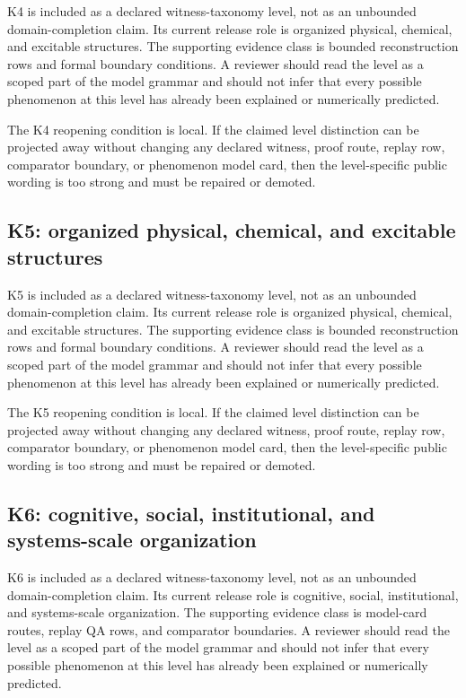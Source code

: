 K4 is included as a declared witness-taxonomy level, not as an unbounded domain-completion claim. Its current release role is organized physical, chemical, and excitable structures. The supporting evidence class is bounded reconstruction rows and formal boundary conditions. A reviewer should read the level as a scoped part of the model grammar and should not infer that every possible phenomenon at this level has already been explained or numerically predicted.


The K4 reopening condition is local. If the claimed level distinction can be projected away without changing any declared witness, proof route, replay row, comparator boundary, or phenomenon model card, then the level-specific public wording is too strong and must be repaired or demoted.


\subsection{K5: organized physical, chemical, and excitable structures}

K5 is included as a declared witness-taxonomy level, not as an unbounded domain-completion claim. Its current release role is organized physical, chemical, and excitable structures. The supporting evidence class is bounded reconstruction rows and formal boundary conditions. A reviewer should read the level as a scoped part of the model grammar and should not infer that every possible phenomenon at this level has already been explained or numerically predicted.


The K5 reopening condition is local. If the claimed level distinction can be projected away without changing any declared witness, proof route, replay row, comparator boundary, or phenomenon model card, then the level-specific public wording is too strong and must be repaired or demoted.


\subsection{K6: cognitive, social, institutional, and systems-scale organization}

K6 is included as a declared witness-taxonomy level, not as an unbounded domain-completion claim. Its current release role is cognitive, social, institutional, and systems-scale organization. The supporting evidence class is model-card routes, replay QA rows, and comparator boundaries. A reviewer should read the level as a scoped part of the model grammar and should not infer that every possible phenomenon at this level has already been explained or numerically predicted.


